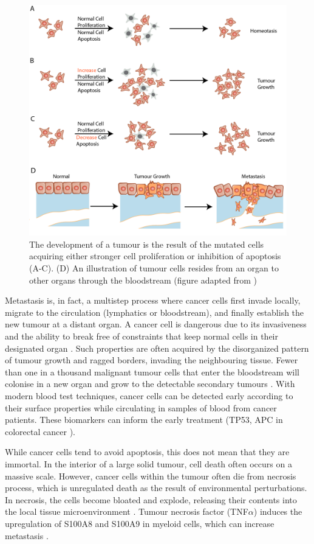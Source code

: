 \begin{figure}[htp]
    \centering
    \includegraphics[width=0.7\columnwidth]{Chapter1/Figures/Chap1_figure3.png}
    \caption[Tumorigenesis and metastasis process. ]{The development of a tumour is the result of the mutated cells acquiring either stronger cell proliferation or inhibition of apoptosis (A-C). (D) An illustration of tumour cells resides from an organ to other organs through the bloodstream (figure adapted from \cite{alberts2018molecular})}
    \label{fig:Chap1_figure3}
\end{figure}

Metastasis is, in fact, a multistep process where cancer cells first invade locally, migrate to the circulation (lymphatics or bloodstream), and finally establish the new tumour at a distant organ. A cancer cell is dangerous due to its invasiveness and the ability to break free of constraints that keep normal cells in their designated organ \cite{greaves2012clonal}. Such properties are often acquired by the disorganized pattern of tumour growth and ragged borders, invading the neighbouring tissue. Fewer than one in a thousand malignant tumour cells that enter the bloodstream will colonise in a new organ and grow to the detectable secondary tumours \cite{joyce2009microenvironmental}. With modern blood test techniques, cancer cells can be detected early according to their surface properties while circulating in samples of blood from cancer patients. These biomarkers can inform the early treatment (\ie TP53, APC in colorectal cancer \cite{markowitz2009molecular}). 

While cancer cells tend to avoid apoptosis, this does not mean that they are immortal. In the interior of a large solid tumour, cell death often occurs on a massive scale. However, cancer cells within the tumour often die from necrosis process, which is unregulated death as the result of environmental perturbations. In necrosis, the cells become bloated and explode, releasing their contents into the local tissue microenvironment \cite{hanahan2011hallmarksnext}. Tumour necrosis factor (TNF$\alpha$) induces the upregulation of S100A8 and S100A9 in myeloid cells, which can increase metastasis \cite{hiratsuka2008s100a8, hiratsuka2006tumour}. 

